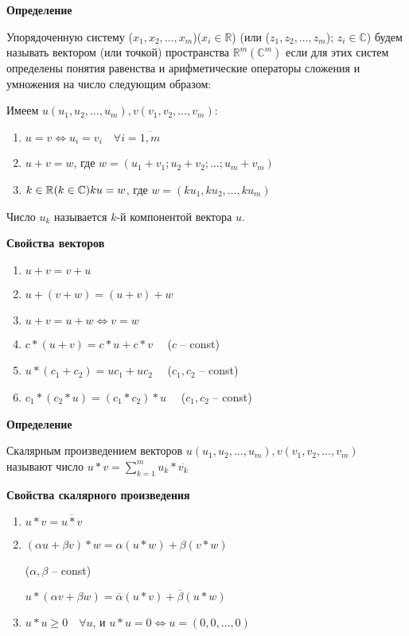 \documentclass{article}
\begin{document}
\textbf{Определение}

Упорядоченную систему ($x_1, x_2, \dots, x_m$)($x_i \in \mathbb{R}$)
(или ($z_1, z_2, \dots, z_m$); $z_i \in \mathbb{C}$) будем называть вектором
(или точкой) пространства $\mathbb{R}^m (\mathbb{C}^m)$ если для этих
систем определены понятия равенства и арифметические операторы сложения
и умножения на число следующим образом:

Имеем $u(u_1, u_2, \dots, u_m), v(v_1, v_2, \dots, v_m)$:

\begin{enumerate}
    \item $u = v \Leftrightarrow u_i = v_i \quad \forall i = \overline{1, m}$
    \item $u + v = w$, где $w = (u_1 + v_1; u_2 + v_2; \dots; u_m + v_m)$
    \item $k \in \mathbb{R} (k \in \mathbb{C}) \\
    ku = w$, где $w = (k u_1, k u_2, \dots, k u_m)$
\end{enumerate}

Число $u_k$ называется $k$-й компонентой вектора $u$.

\textbf{Свойства векторов}

\begin{enumerate}
    \item $u + v = v + u$
    \item $u + (v + w) = (u + v) + w$
    \item $u + v = u + w \Leftrightarrow v = w$
    \item $c * (u + v) = c * u + c * v \quad$ ($c$ -- const)
    \item $u * (c_1 + c_2) = u c_1 + u c_2 \quad$ ($c_1, c_2$ -- const)
    \item $c_1 * (c_2 * u) = (c_1 * c_2) * u \quad$ ($c_1, c_2$ -- const)
\end{enumerate}

\textbf{Определение}

Скалярным произведением векторов $u(u_1, u_2, \dots, u_m), v(v_1, v_2, \dots, v_m)$
называют число $u * v = \displaystyle\sum_{k = 1}^{m} u_k * \overline{v_k}$

\textbf{Свойства скалярного произведения}

\begin{enumerate}
    \item $u * v = \overline{u * v}$
    \item $(\alpha u + \beta v) * w = \alpha (u * w) + \beta (v * w)$

    ($\alpha, \beta$ -- const)

    $u * (\alpha v + \beta w) = \overline{\alpha} (u * v) + \overline{\beta} (u * w)$

    \item $u * u \ge 0 \quad \forall u$, и $u * u = 0 \Leftrightarrow u = (0,0,\dots,0)$
\end{enumerate}
\end{document}
